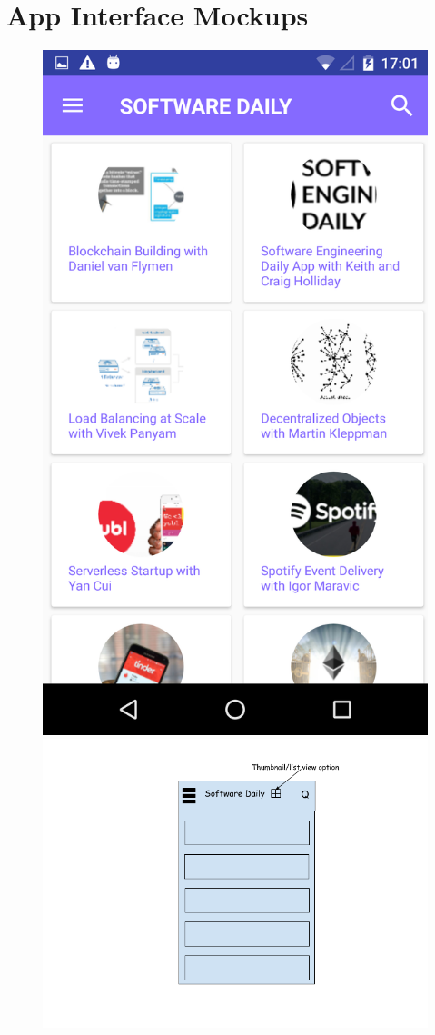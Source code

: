 \documentclass{article}
\begin{document}
\section{App Interface Mockups}
\begin{figure}[h]
\centering
\begin{minipage}{.5\textwidth}
  \centering
  \includegraphics[width=.4\linewidth]{img/sedaily_main.png}
\end{minipage}%
\begin{minipage}{.7\textwidth}
  \centering
  \includegraphics[width=.9\linewidth]{img/list_view.png}
\end{minipage}
\end{figure}
\end{document}
